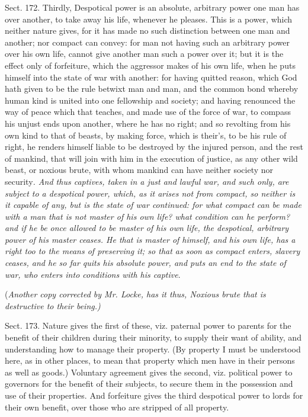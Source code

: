 \documentclass[11pt,openany]{book}
\begin{document}
Sect. 172. Thirdly, Despotical power is an absolute, arbitrary power one man has over another, to take away his life, whenever he pleases. This is a power, which neither nature gives, for it has made no such distinction between one man and another; nor compact can convey: for man not having such an arbitrary power over his own life, cannot give another man such a power over it; but it is the effect only of forfeiture, which the aggressor makes of his own life, when he puts himself into the state of war with another: for having quitted reason, which God hath given to be the rule betwixt man and man, and the common bond whereby human kind is united into one fellowship and society; and having renounced the way of peace which that teaches, and made use of the force of war, to compass his unjust ends upon another, where he has no right; and so revolting from his own kind to that of beasts, by making force, which is their's, to be his rule of right, he renders himself liable to be destroyed by the injured person, and the rest of mankind, that will join with him in the execution of justice, as any other wild beast, or noxious brute, with whom mankind can have neither society nor security\emph{. And thus captives, taken in a just and lawful war, and such only, are subject to a despotical power, which, as it arises not from compact, so neither is it capable of any, but is the state of war continued: for what compact can be made with a man that is not master of his own life? what condition can he perform? and if he be once allowed to be master of his own life, the despotical, arbitrary power of his master ceases. He that is master of himself, and his own life, has a right too to the means of preserving it; so that as soon as compact enters, slavery ceases, and he so far quits his absolute power, and puts an end to the state of war, who enters into conditions with his captive}.

(\emph{Another copy corrected by Mr. Locke, has it thus, Noxious brute that is destructive to their being.)}

Sect. 173. Nature gives the first of these, viz. paternal power to parents for the benefit of their children during their minority, to supply their want of ability, and understanding how to manage their property. (By property I must be understood here, as in other places, to mean that property which men have in their persons as well as goods.) Voluntary agreement gives the second, viz. political power to governors for the benefit of their subjects, to secure them in the possession and use of their properties. And forfeiture gives the third despotical power to lords for their own benefit, over those who are stripped of all property.
\end{document}
